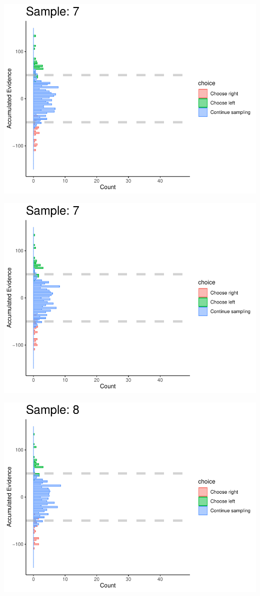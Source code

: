 \documentclass[
]{book}
\begin{document}
\begin{center}\includegraphics[width=0.8\linewidth]{LateNightBayes_files/figure-latex/fixed_check-67} \end{center}

\begin{center}\includegraphics[width=0.8\linewidth]{LateNightBayes_files/figure-latex/fixed_check-68} \end{center}

\begin{center}\includegraphics[width=0.8\linewidth]{LateNightBayes_files/figure-latex/fixed_check-69} \end{center}
\end{document}
